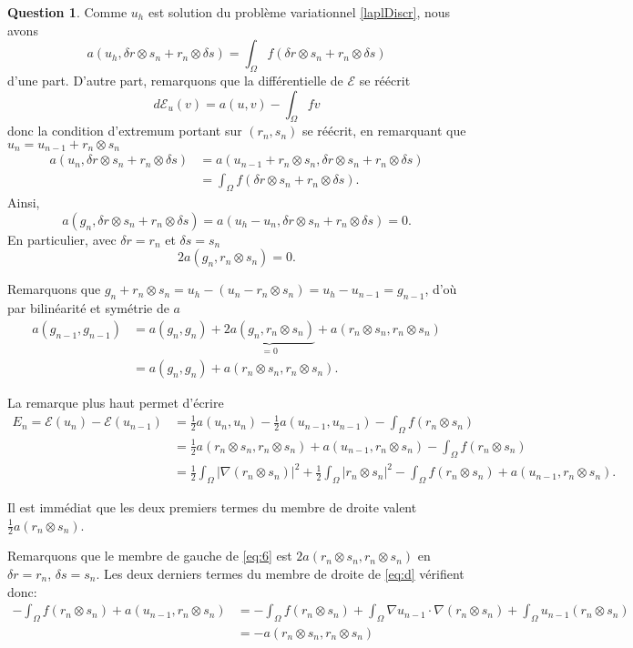 \documentclass[11pt]{article}
\theoremstyle{definition}
\newtheorem{ques}{Question}
\begin{document}
\begin{ques}
Comme $u_h$ est solution du problème variationnel \eqref{laplDiscr}, nous avons
\[
a(u_h,\delta r\otimes s_n + r_n\otimes \delta s) = \int_\Omega f(\delta r\otimes s_n + r_n\otimes \delta s)
\]
d'une part. D'autre part, remarquons que la différentielle de $\mathcal{E}$ se réécrit
\[
d\mathcal{E}_u(v) = a(u,v) - \int_\Omega fv
\]
donc la condition d'extremum portant sur $(r_n,s_n)$ se réécrit, en remarquant que $u_n = u_{n-1} + r_n\otimes s_n$
\begin{align*}
a(u_n,\delta r\otimes s_n + r_n\otimes\delta s) &=
a(u_{n-1}+r_n\otimes s_n, \delta r\otimes s_n + r_n\otimes\delta s) \\
&= \int_\Omega f(\delta r\otimes s_n + r_n\otimes\delta s).
\end{align*}
Ainsi,
\[
\boxed{a(g_n,\delta r\otimes s_n + r_n\otimes\delta s) = a(u_h-u_n,\delta r\otimes s_n + r_n\otimes\delta s) = 0.}
\]
En particulier, avec $\delta r = r_n$ et $\delta s= s_n$
\[
2a(g_n,r_n\otimes s_n) = 0.
\]

Remarquons que $g_n + r_n\otimes s_n = u_h - (u_n - r_n\otimes s_n) = u_h - u_{n-1} = g_{n-1}$, d'où par bilinéarité et symétrie de $a$
\begin{align*}
\boxed{a(g_{n-1},g_{n-1})} 
&= a(g_n,g_n) + \underbrace{2a(g_n,r_n\otimes s_n)}_{=0} + a(r_n\otimes s_n,r_n\otimes s_n) \\
&\boxed{= a(g_n,g_n) + a(r_n\otimes s_n,r_n\otimes s_n).}
\end{align*}

La remarque plus haut permet d'écrire
\begin{align*}
\boxed{E_n = \mathcal{E}(u_n) - \mathcal{E}(u_{n-1})}
&= \frac 12a(u_n,u_n) - \frac 12 a(u_{n-1},u_{n-1}) - \int_\Omega f(r_n\otimes s_n) \\
&= \frac 12 a(r_n\otimes s_n,r_n\otimes s_n) + a(u_{n-1},r_n\otimes s_n) - \int_\Omega f(r_n\otimes s_n) \\
&\boxed{= \frac 12\int_\Omega |\nabla(r_n\otimes s_n)|^2 + \frac 12\int_\Omega |r_n\otimes s_n|^2 - \int_\Omega f(r_n\otimes s_n) + a(u_{n-1},r_n\otimes s_n).}\tag{d}\label{eq:d}
\end{align*}

Il est immédiat que les deux premiers termes du membre de droite valent $\frac 12a(r_n\otimes s_n)$.

Remarquons que le membre de gauche de \eqref{eq:6} est $2a(r_n\otimes s_n,r_n\otimes s_n)$ en $\delta r=r_n$, $\delta s=s_n$. Les deux derniers termes du membre de droite de \eqref{eq:d} vérifient donc:
\begin{align*}
-\int_\Omega f(r_n\otimes s_n) + a(u_{n-1},r_n\otimes s_n) 
&= -\int_\Omega f(r_n\otimes s_n) + \int_\Omega \nabla u_{n-1}\cdot\nabla(r_n\otimes s_n) + \int_\Omega u_{n-1}(r_n\otimes s_n) \\
&= -a(r_n\otimes s_n,r_n\otimes s_n)
\end{align*}


\end{ques}
\end{document}
